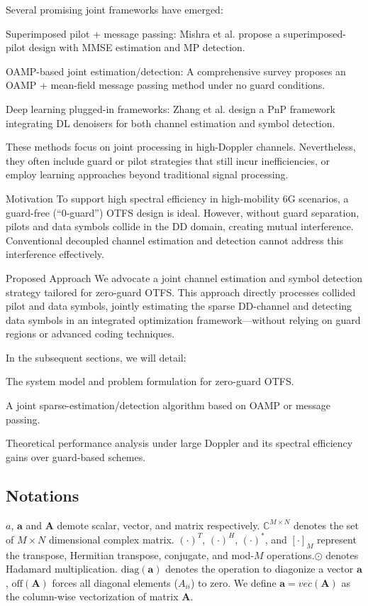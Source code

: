 \documentclass{article}
\begin{document}
Several promising joint frameworks have emerged:

Superimposed pilot + message passing: Mishra et al. propose a superimposed-pilot design with MMSE estimation and MP detection.

OAMP-based joint estimation/detection: A comprehensive survey proposes an OAMP + mean-field message passing method under no guard conditions.

Deep learning plugged-in frameworks: Zhang et al. design a PnP framework integrating DL denoisers for both channel estimation and symbol detection.

These methods focus on joint processing in high-Doppler channels. Nevertheless, they often include guard or pilot strategies that still incur inefficiencies, or employ learning approaches beyond traditional signal processing.

Motivation
To support high spectral efficiency in high-mobility 6G scenarios, a guard-free (“0‑guard”) OTFS design is ideal. However, without guard separation, pilots and data symbols collide in the DD domain, creating mutual interference. Conventional decoupled channel estimation and detection cannot address this interference effectively.

Proposed Approach
We advocate a joint channel estimation and symbol detection strategy tailored for zero-guard OTFS. This approach directly processes collided pilot and data symbols, jointly estimating the sparse DD-channel and detecting data symbols in an integrated optimization framework—without relying on guard regions or advanced coding techniques.

In the subsequent sections, we will detail:

The system model and problem formulation for zero-guard OTFS.

A joint sparse-estimation/detection algorithm based on OAMP or message passing.

Theoretical performance analysis under large Doppler and its spectral efficiency gains over guard-based schemes.

\subsection{Notations}
$a$, $\bm{a}$ and $\bm{A}$ demote scalar, vector, and matrix respectively. $\mathbb{C}^{M\times N}$ denotes the set of $M\times N$ dimensional complex matrix. $(\cdot)^T$, $(\cdot)^H$, $(\cdot)^*$, and $[\cdot]_M$ represent the transpose, Hermitian transpose, conjugate, and mod-$M$ operations.$\odot$ denotes Hadamard multiplication. $\text{diag}(\bm a)$ denotes the operation to diagonize a vector $\bm a$, $\text{off}(\bm{A})$ forces all diagonal elements ($A_{ii}$) to zero. We define $\bm{a}=vec(\bm{A})$ as the column-wise vectorization of matrix $\bm{A}$.
\end{document}
